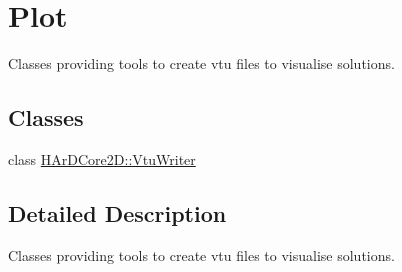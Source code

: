 \hypertarget{group__Plot}{}\section{Plot}
\label{group__Plot}


Classes providing tools to create vtu files to visualise solutions.  


\subsection*{Classes}
\begin{DoxyCompactItemize}
\item 
class \hyperlink{classHArDCore2D_1_1VtuWriter}{H\+Ar\+D\+Core2\+D\+::\+Vtu\+Writer}
\end{DoxyCompactItemize}


\subsection{Detailed Description}
Classes providing tools to create vtu files to visualise solutions. 

